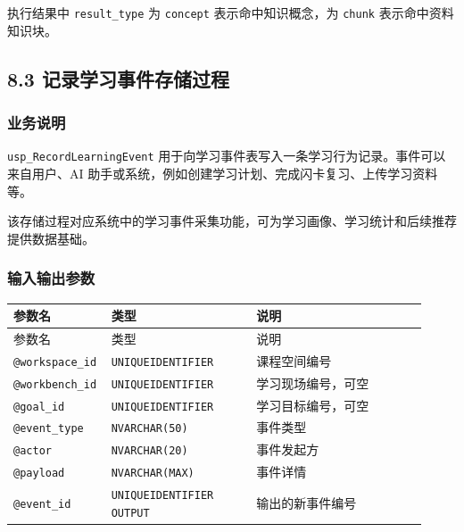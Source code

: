 \documentclass[10pt,a4paper,fontset=none]{ctexart}
\begin{document}
执行结果中 \texttt{result\_type} 为 \texttt{concept} 表示命中知识概念，为 \texttt{chunk} 表示命中资料知识块。\par

\subsection*{8.3 记录学习事件存储过程}

\subsubsection*{业务说明}

\texttt{usp\_RecordLearningEvent} 用于向学习事件表写入一条学习行为记录。事件可以来自用户、AI 助手或系统，例如创建学习计划、完成闪卡复习、上传学习资料等。\par

该存储过程对应系统中的学习事件采集功能，可为学习画像、学习统计和后续推荐提供数据基础。\par

\subsubsection*{输入输出参数}

\begingroup\scriptsize
\renewcommand{\arraystretch}{1.18}
\setlength{\LTleft}{0pt}
\setlength{\LTright}{0pt}
\begin{longtable}{>{\raggedright\arraybackslash}p{0.18\linewidth}>{\raggedright\arraybackslash}p{0.34\linewidth}>{\raggedright\arraybackslash}p{0.40\linewidth}}
\toprule
参数名 & 类型 & 说明 \\
\midrule
\endfirsthead
\toprule
参数名 & 类型 & 说明 \\
\midrule
\endhead
\texttt{@workspace\_id} & \texttt{UNIQUEIDENTIFIER} & 课程空间编号 \\
\texttt{@workbench\_id} & \texttt{UNIQUEIDENTIFIER} & 学习现场编号，可空 \\
\texttt{@goal\_id} & \texttt{UNIQUEIDENTIFIER} & 学习目标编号，可空 \\
\texttt{@event\_type} & \texttt{NVARCHAR(50)} & 事件类型 \\
\texttt{@actor} & \texttt{NVARCHAR(20)} & 事件发起方 \\
\texttt{@payload} & \texttt{NVARCHAR(MAX)} & 事件详情 \\
\texttt{@event\_id} & \texttt{UNIQUEIDENTIFIER OUTPUT} & 输出的新事件编号 \\
\bottomrule
\end{longtable}
\endgroup
\end{document}
